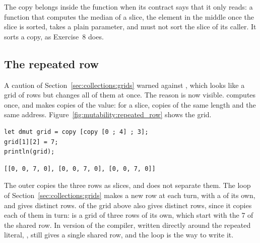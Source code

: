 The copy belongs inside the function when its contract says that it only reads:
a function that computes the median of a slice, the element in the middle once
the slice is sorted, takes a plain parameter, and must not sort the slice of its
caller. It sorts a copy, as Exercise~8 does.

\subsection{The repeated row}
\label{sec:mutability:repeated_row}

A caution of Section~\ref{sec:collections:grids} warned against
, which looks like a grid of 
rows but changes all of them at once. The reason is now visible. \token{[v ; n]}
computes  once, and makes  copies of the value: for a slice,
 copies of the same length and the same address.
Figure~\ref{fig:mutability:repeated_row} shows the grid.



\begin{lstlisting}[style=coloredverbatim]
let dmut grid = copy [copy [0 ; 4] ; 3];
grid[1][2] = 7;
println(grid);
\end{lstlisting}
\vspace{-10pt}%
\begin{lstlisting}[style=bashVerb]
[[0, 0, 7, 0], [0, 0, 7, 0], [0, 0, 7, 0]]
\end{lstlisting}

The outer  copies the three rows as slices, and does not separate
them. The loop of Section~\ref{sec:collections:grids} makes a new row at each
turn, with a  of its own, and gives distinct rows.  of
the grid above also gives distinct rows, since it copies each of them in turn:
 is a grid of three rows of its own, which
start with the 7 of the shared row. In version \gycversion{} of the compiler,
 written directly around the repeated literal,
, still gives a single shared row, and the loop
is the way to write it.
